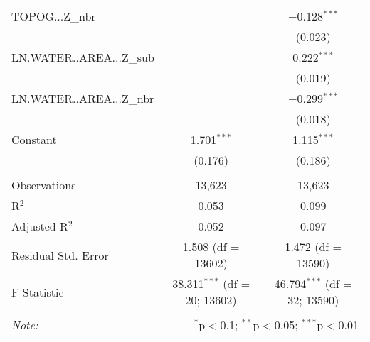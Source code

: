 \begin{table}[!htbp]
\begin{tabular}{@{\extracolsep{5pt}}lcc}
  TOPOG...Z\_nbr &  & $-$0.128$^{***}$ \\ 
  &  & (0.023) \\ 
  LN.WATER..AREA...Z\_sub &  & 0.222$^{***}$ \\ 
  &  & (0.019) \\ 
  LN.WATER..AREA...Z\_nbr &  & $-$0.299$^{***}$ \\ 
  &  & (0.018) \\ 
  Constant & 1.701$^{***}$ & 1.115$^{***}$ \\ 
  & (0.176) & (0.186) \\ 
 \hline \\[-1.8ex] 
Observations & 13,623 & 13,623 \\ 
R$^{2}$ & 0.053 & 0.099 \\ 
Adjusted R$^{2}$ & 0.052 & 0.097 \\ 
Residual Std. Error & 1.508 (df = 13602) & 1.472 (df = 13590) \\ 
F Statistic & 38.311$^{***}$ (df = 20; 13602) & 46.794$^{***}$ (df = 32; 13590) \\ 
\hline 
\hline \\[-1.8ex] 
\textit{Note:}  & \multicolumn{2}{r}{$^{*}$p$<$0.1; $^{**}$p$<$0.05; $^{***}$p$<$0.01} \\ 
\end{tabular} 
\end{table} 
